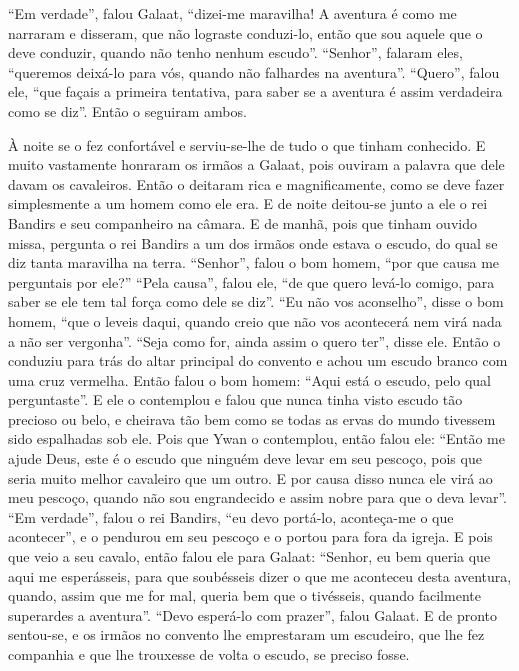 “Em verdade”, falou Galaat, “dizei-me maravilha! A aventura é como me narraram e
disseram, que não lograste conduzi-lo, então que sou aquele que o deve
conduzir, quando não tenho nenhum escudo”.  “Senhor”, falaram eles, “queremos
deixá-lo para vós, quando não falhardes na aventura”. “Quero”, falou ele, “que
façais a primeira tentativa, para saber se a aventura é assim verdadeira como
se diz”. Então o seguiram ambos. 

À noite se o fez confortável e serviu-se-lhe de tudo o que tinham conhecido.  E
muito vastamente honraram os irmãos a Galaat, pois ouviram a palavra que dele
davam os cavaleiros. Então o deitaram rica e magnificamente, como se deve fazer
simplesmente a um homem como ele era. E de noite deitou-se junto a ele
o rei Bandirs e seu companheiro na câmara. E de manhã, pois que tinham ouvido
missa, pergunta o rei Bandirs a um dos irmãos onde estava o escudo, do qual se
diz tanta maravilha na terra. “Senhor”, falou o bom homem, “por que causa me
perguntais por ele?” “Pela causa”, falou ele, “de que quero levá-lo comigo,
para saber se ele tem tal força como dele se diz”. “Eu não vos aconselho”,
disse o bom homem, “que o leveis daqui, quando creio que não vos acontecerá nem
virá nada a não ser vergonha”. “Seja como for, ainda assim o quero ter”, disse
ele. Então o conduziu para trás do altar principal do convento e achou
um escudo branco com uma cruz vermelha. Então falou o bom homem: “Aqui está o
escudo, pelo qual perguntaste”. E ele o contemplou e falou que nunca tinha
visto escudo tão precioso ou belo, e cheirava tão bem como se todas as ervas do
mundo tivessem sido espalhadas sob ele. Pois que Ywan o contemplou, então falou
ele: “Então me ajude Deus, este é o escudo que ninguém deve levar em seu
pescoço, pois que seria muito melhor cavaleiro que um outro. E por causa disso
nunca ele virá ao meu pescoço, quando não sou engrandecido e assim nobre para
que o deva levar”. “Em verdade”, falou o rei Bandirs, “eu devo
portá-lo, aconteça-me o que acontecer”, e o pendurou em seu pescoço e o portou
para fora da igreja. E pois que veio a seu cavalo, então falou ele para Galaat:
“Senhor, eu bem queria que aqui me esperásseis, para que soubésseis dizer o que
me aconteceu desta aventura, quando, assim que me for mal, queria bem que o
tivésseis, quando facilmente superardes a aventura”. “Devo esperá-lo
com prazer”, falou Galaat. E de pronto sentou-se, e os irmãos no convento lhe
emprestaram um escudeiro, que lhe fez companhia e que lhe trouxesse de volta o
escudo, se preciso fosse. 

